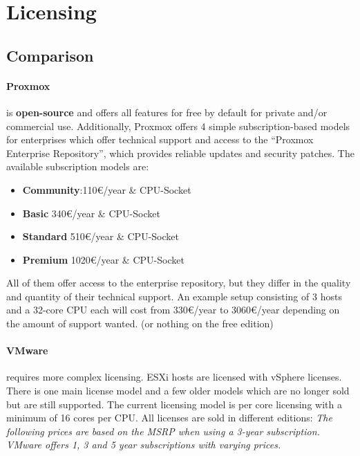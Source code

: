 
\section{Licensing}

\subsection{Comparison}

\paragraph{Proxmox} 
is \textbf{open-source} and offers all features for free by default for private and/or commercial use. Additionally, Proxmox offers 4 simple subscription-based models for enterprises which offer technical support and access to the \enquote{Proxmox Enterprise Repository}, which provides reliable updates and security patches. The available subscription models are:
\begin{itemize}
	\item \textbf{Community}:\num{ 110}€/year \& CPU-Socket
	\item \textbf{Basic} \num{340}€/year \& CPU-Socket
	\item \textbf{Standard} \num{510}€/year \& CPU-Socket
	\item \textbf{Premium} \num{1020}€/year \& CPU-Socket
\end{itemize}
All of them offer access to the enterprise repository, but they differ in the quality and quantity of their technical support.\newline
An example setup consisting of 3 hosts and a 32-core CPU each will cost from \num{330}€/year to \num{3060}€/year depending on the amount of support wanted. (or nothing on the free edition)


\paragraph{VMware} requires more complex licensing.\newline
ESXi hosts are licensed with vSphere licenses. There is one main license model and a few older models which are no longer sold but are still supported. The current licensing model is per core licensing with a minimum of 16 cores per CPU. All licenses are sold in different editions:\newline 
\textit{The following prices are based on the MSRP when using a 3-year subscription. VMware offers 1, 3 and 5 year subscriptions with varying prices.}

